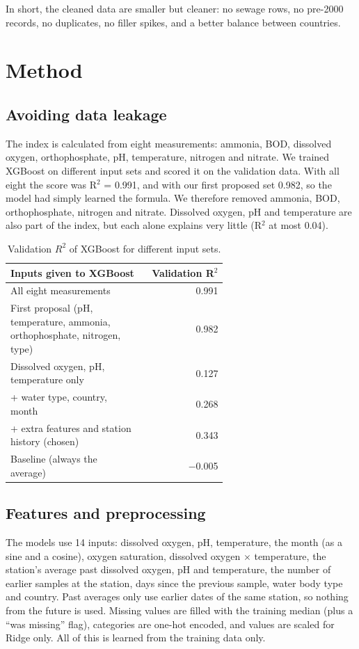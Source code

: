 \documentclass[conference]{IEEEtran}
\begin{document}
In short, the cleaned data are smaller but cleaner: no sewage rows, no pre-2000 records, no duplicates, no filler spikes, and a better balance between countries.


\section{Method}
\subsection{Avoiding data leakage}\label{sec:leak}
The index is calculated from eight measurements: ammonia, BOD, dissolved oxygen, orthophosphate, pH, temperature, nitrogen and nitrate. We trained XGBoost on different input sets and scored it on the validation data. With all eight the score was R$^2$ = 0.991, and with our first proposed set 0.982, so the model had simply learned the formula. We therefore removed ammonia, BOD, orthophosphate, nitrogen and nitrate. Dissolved oxygen, pH and temperature are also part of the index, but each alone explains very little (R$^2$ at most 0.04).

\begin{table}[!t]\caption{Validation $R^2$ of XGBoost for different input sets.}\centering
{\footnotesize\setlength{\tabcolsep}{3pt}\begin{tabular}{>{\raggedright\arraybackslash}p{0.62\linewidth}r}\toprule
\textbf{Inputs given to XGBoost} & \textbf{Validation R$^2$}\\\midrule
All eight measurements & 0.991\\
First proposal (pH, temperature, ammonia, orthophosphate, nitrogen, type) & 0.982\\
Dissolved oxygen, pH, temperature only & 0.127\\
+ water type, country, month & 0.268\\
+ extra features and station history (chosen) & 0.343\\
Baseline (always the average) & $-$0.005\\
\bottomrule\end{tabular}}
\end{table}

\subsection{Features and preprocessing}
The models use 14 inputs: dissolved oxygen, pH, temperature, the month (as a sine and a cosine), oxygen saturation, dissolved oxygen $\times$ temperature, the station's average past dissolved oxygen, pH and temperature, the number of earlier samples at the station, days since the previous sample, water body type and country. Past averages only use earlier dates of the same station, so nothing from the future is used. Missing values are filled with the training median (plus a ``was missing'' flag), categories are one-hot encoded, and values are scaled for Ridge only. All of this is learned from the training data only.
\end{document}
